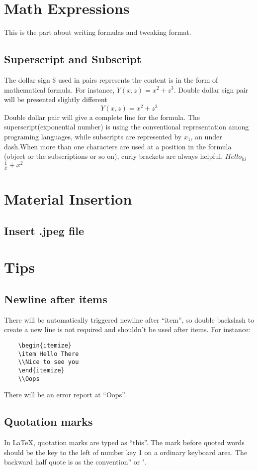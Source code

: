 \documentclass[12pt]{article}
\begin{document}
\section{Math Expressions}	
This is the part about writing formulas and tweaking format.
	\subsection{Superscript and Subscript}
The dollar sign \$ used in pairs represents the content is in the form of mathematical formula. For instance, $Y(x,z)=x^2+z^3$. Double dollar sign pair will be presented slightly different $$Y(x,z)=x^2+z^3$$ Double dollar pair will give a complete line for the formula. The superscript(exponential number) is using the conventional representation among programing languages, while subscripts are represented by $x_1$, an under dash.When more than one characters are used at a position in the formula (object or the subscriptions or so on), curly brackets are always helpful. ${Hello}_{hi}$
$ \frac{1}{x}+x^2$
\section{Material Insertion}
	\subsection{Insert .jpeg file}
\section{Tips}
	\subsection{Newline after items}
	There will be automatically triggered newline after ``item'', so double backslash to create a new line is not required and shouldn't be used after items. For instance:
	\begin{lstlisting}	
	\begin{itemize}
	\item Hello There
	\\Nice to see you
	\end{itemize}
	\\Oops
	\end{lstlisting}
	There will be an error report at ``Oops''.
	\subsection{Quotation marks}
	In \LaTeX, quotation marks are typed as ``this''. The mark before quoted words should be the key to the left of number key 1 on a ordinary keyboard area. The backward half quote is as the convention'' or ".
	
	
\end{document}
